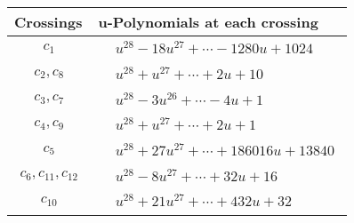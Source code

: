 \documentclass[1p]{elsarticle_modified}
\theoremstyle{definition}
\begin{document}
\begin{tabular}{m{50pt}|m{274pt}}
Crossings & \hspace{64pt}u-Polynomials at each crossing \\
\hline $$\begin{aligned}c_{1}\end{aligned}$$&$\begin{aligned}
&u^{28}-18 u^{27}+\cdots-1280 u+1024
\end{aligned}$\\
\hline $$\begin{aligned}c_{2},c_{8}\end{aligned}$$&$\begin{aligned}
&u^{28}+u^{27}+\cdots+2 u+10
\end{aligned}$\\
\hline $$\begin{aligned}c_{3},c_{7}\end{aligned}$$&$\begin{aligned}
&u^{28}-3 u^{26}+\cdots-4 u+1
\end{aligned}$\\
\hline $$\begin{aligned}c_{4},c_{9}\end{aligned}$$&$\begin{aligned}
&u^{28}+u^{27}+\cdots+2 u+1
\end{aligned}$\\
\hline $$\begin{aligned}c_{5}\end{aligned}$$&$\begin{aligned}
&u^{28}+27 u^{27}+\cdots+186016 u+13840
\end{aligned}$\\
\hline $$\begin{aligned}c_{6},c_{11},c_{12}\end{aligned}$$&$\begin{aligned}
&u^{28}-8 u^{27}+\cdots+32 u+16
\end{aligned}$\\
\hline $$\begin{aligned}c_{10}\end{aligned}$$&$\begin{aligned}
&u^{28}+21 u^{27}+\cdots+432 u+32
\end{aligned}$\\
\hline
\end{tabular}\\~\\
\newpage\renewcommand{\arraystretch}{1}
\end{document}

